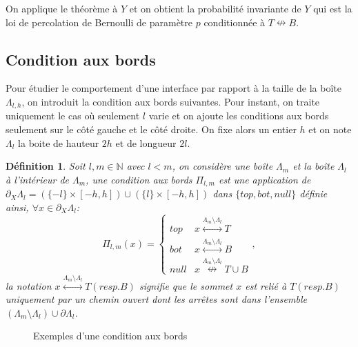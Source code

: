 \documentclass[titlepage,a4paper,11pt]{article}
\newcounter{def}
\newcounter{cor}
\newtheorem{cdb}[def]{Définition}
\newcommand{\connect}{\leftrightarrow}
\newcommand{\nconnect}{\nleftrightarrow}
\begin{document}
On applique le théorème à $Y$ et on obtient la probabilité invariante de $Y$ qui est la loi de percolation de Bernoulli de paramètre $p$ conditionnée à $T\nconnect B$.

\subsection{Condition aux bords}
Pour étudier le comportement d'une interface par rapport à la taille de la boîte $\Lambda_{l,h}$, on introduit la condition aux bords suivantes. Pour instant, on traite uniquement le cas où seulement $l$ varie et on ajoute les conditions aux bords seulement sur le côté gauche et le côté droite. On fixe alors un entier $h$ et on note $\Lambda_l$ la boite de hauteur $2h$ et de longueur $2l$.
\begin{cdb}Soit $l,m\in \mathbb{N}$ avec $l<m$, on considère une boîte $\Lambda_m$ et la boîte $\Lambda_l$ à l'intérieur de $\Lambda_m$, une condition aux bords $\Pi_{l,m}$ est une application de $\partial_{X}\Lambda_{l} =(\{-l\}\times[-h,h]) \cup (\{l\}\times [-h,h])$ dans $\{top,bot,null\}$ définie ainsi, $\forall x\in \partial_X\Lambda_{l}$:
$$\Pi_{l,m}(x)=\left\lbrace \begin{array}{cc}
top & x\overset{\Lambda_m \setminus \Lambda_l}{\connect} T\\
bot & x\overset{\Lambda_m \setminus \Lambda_l}{\connect} B\\
null & x\overset{\Lambda_m \setminus \Lambda_l}{\nconnect} T\cup B 
\end{array} \right.,
$$
la notation $x\overset{\Lambda_m \setminus \Lambda_l}{\connect} T(resp. B)$ signifie que le sommet $x$ est relié à $T(resp. B)$ uniquement par un chemin ouvert dont les arrêtes sont dans l'ensemble $(\Lambda_m \setminus \Lambda_l) \cup \partial \Lambda_l$.
\end{cdb}
\begin{figure}[h]
\center
{}
\caption{Exemples d'une condition aux bords}
\end{figure}
\end{document}
